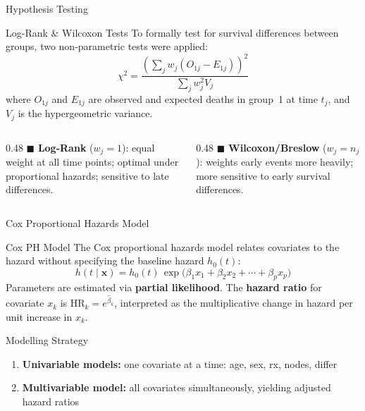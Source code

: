 \documentclass[aspectratio=169, 10pt]{beamer}
\begin{document}
\begin{frame}{Hypothesis Testing}
	
	\begin{block}{Log-Rank \& Wilcoxon Tests}
		\large
		To formally test for survival differences between groups,
		two non-parametric tests were applied:
		\[
		\chi^2 = \frac{\left(\sum_j w_j(O_{1j} - E_{1j})\right)^2}
		{\sum_j w_j^2 V_j}
		\]
		where $O_{1j}$ and $E_{1j}$ are observed and expected deaths
		in group~1 at time $t_j$, and $V_j$ is the hypergeometric
		variance.
	\end{block}
	
	\vspace{6pt}
	
	\begin{columns}[T]
		\begin{column}{0.48\textwidth}
			\large
			$\blacksquare$ \textbf{Log-Rank} ($w_j = 1$): equal weight
			at all time points; optimal under proportional hazards;
			sensitive to late differences.
		\end{column}
		\begin{column}{0.48\textwidth}
			\large
			$\blacksquare$ \textbf{Wilcoxon/Breslow} ($w_j = n_j$):
			weights early events more heavily; more sensitive to
			early survival differences.
		\end{column}
	\end{columns}
	
\end{frame}


\begin{frame}{Cox Proportional Hazards Model}
	
	\begin{block}{Cox PH Model}
		\large
		The Cox proportional hazards model relates covariates to the
		hazard without specifying the baseline hazard $h_0(t)$:
		\[
		h(t \mid \mathbf{x}) = h_0(t)\,
		\exp\!\bigl(\beta_1 x_1 + \beta_2 x_2 + \cdots + \beta_p x_p\bigr)
		\]
		Parameters are estimated via \textbf{partial likelihood}.
		The \textbf{hazard ratio} for covariate $x_k$ is
		$\text{HR}_k = e^{\hat\beta_k}$, interpreted as the
		multiplicative change in hazard per unit increase in $x_k$.
	\end{block}
	
	\vspace{6pt}
	
	\begin{block}{Modelling Strategy}
		\begin{enumerate}
			\large
			\item \textbf{Univariable models:} one covariate at a time:
			age, sex, rx, nodes, differ
			\item \textbf{Multivariable model:} all covariates
			simultaneously, yielding adjusted hazard ratios
		\end{enumerate}
	\end{block}
	
\end{frame}
\end{document}
